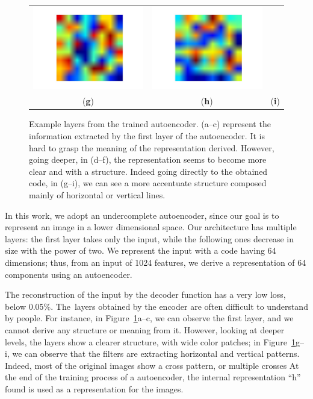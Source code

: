 \begin{figure}[h]
\begin{tabular}{ccc}
        \includegraphics[width=0.2\columnwidth]{images/05-modeling/autoencoder_levels/autoencoders_7_1} &
        \includegraphics[width=0.2\columnwidth]{images/05-modeling/autoencoder_levels/autoencoders_7_2} \\
        (\textbf{g}) & (\textbf{h}) & (\textbf{i}) \\
    \end{tabular}
    \caption{Example layers from the trained autoencoder. (a--c) represent the information extracted by the first layer of the autoencoder. It is hard to grasp the meaning of the representation derived. However, going deeper, in (d--f), the representation seems to become more clear and with a structure. Indeed going directly to the obtained code, in (g--i), we can see a more accentuate structure composed mainly of horizontal or vertical lines.}
    \label{fig:levels_autoencoder}
\end{figure}

In this work, we adopt an undercomplete autoencoder, since our goal is to represent an image in a lower dimensional space. 
Our architecture has multiple layers: the first layer takes only the input, while the following ones decrease in size with the power of two.
We represent the input with a code having 64 dimensions; thus, from an input of 1024 features, we derive a representation of 64 components using an autoencoder.

The reconstruction of the input by the decoder function has a very low loss, below 0.05\%. The~layers obtained by the encoder are often difficult to understand by people. For instance, in Figure~\ref{fig:levels_autoencoder}a--c, we can observe the first layer, and we cannot derive any structure or meaning from it. However, looking at deeper levels, the layers show a clearer structure, with wide color patches; in Figure~\ref{fig:levels_autoencoder}g--i, we can observe that the filters are extracting horizontal and vertical patterns. Indeed, most of the original images show a cross pattern, or multiple crosses At the end of the training process of a autoencoder, the internal representation ``h'' found is used as a representation for the images.

